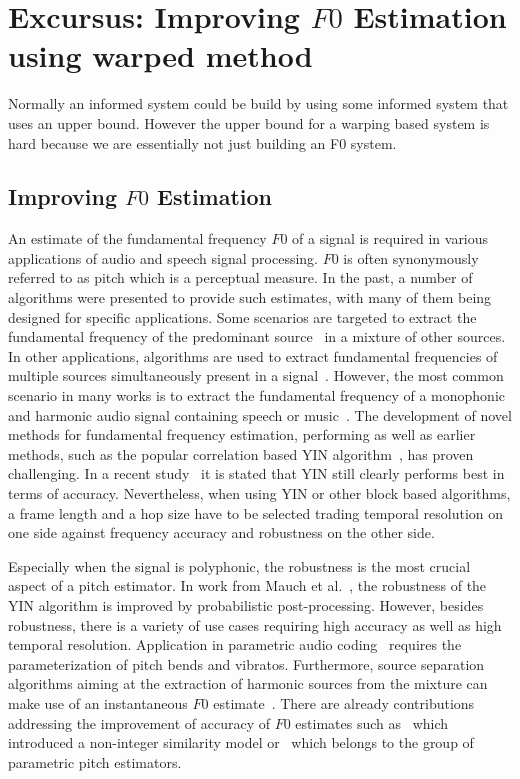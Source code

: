 \section{Excursus: Improving $F0$ Estimation using warped method} %
\label{sec:method}

Normally an informed system could be build by using some informed system that uses an upper bound.
However the upper bound for a warping based system is hard because we are essentially not just building an F0 system.

\subsection{Improving $F0$ Estimation}

An estimate of the fundamental frequency $F0$ of a signal is required in various applications of audio and speech signal processing. $F0$ is often synonymously referred to as pitch which is a perceptual measure. In the past, a number of algorithms were presented to provide such estimates, with many of them being designed for specific applications. Some scenarios are targeted to extract the fundamental frequency of the predominant source~\cite{salamon12} in a mixture of other sources. In other applications, algorithms are used to extract fundamental frequencies of multiple sources simultaneously present in a signal~\cite{klapuri2003multiple}. However, the most common scenario in many works is to extract the fundamental frequency of a monophonic and harmonic audio signal containing speech or music~\cite{talkin1995robust, boersma2002praat, de2002yin, resch, camacho2007swipe, tidhar2010high, christensen2007joint}.
%
The development of novel methods for fundamental frequency estimation, performing as well as earlier methods, such as the popular correlation based \textsc{YIN} algorithm~\cite{de2002yin}, has proven challenging. In a recent study~\cite{babacan2013comparative} it is stated that YIN still clearly performs best in terms of accuracy. Nevertheless, when using YIN or other block based algorithms, a frame length and a hop size have to be selected trading temporal resolution on one side against frequency accuracy and robustness on the other side.

Especially when the signal is polyphonic, the robustness is the most crucial aspect of a pitch estimator. In work from Mauch et al.~\cite{mauch2014pyin}, the robustness of the \textsc{YIN} algorithm is improved by probabilistic post-processing. However, besides robustness, there is a variety of use cases requiring high accuracy as well as high temporal resolution. Application in parametric audio coding~\cite{purnhagen2000hiln} requires the parameterization of pitch bends and vibratos. Furthermore, source separation algorithms aiming at the extraction of harmonic sources from the mixture can make use of an instantaneous $F0$ estimate~\cite{virtanen2008combining, stoterunison}. There are already contributions addressing the improvement of accuracy of $F0$ estimates such as~\cite{medan1991super} which introduced a non-integer similarity model or~\cite{christensen2007joint} which belongs to the group of parametric pitch estimators.

